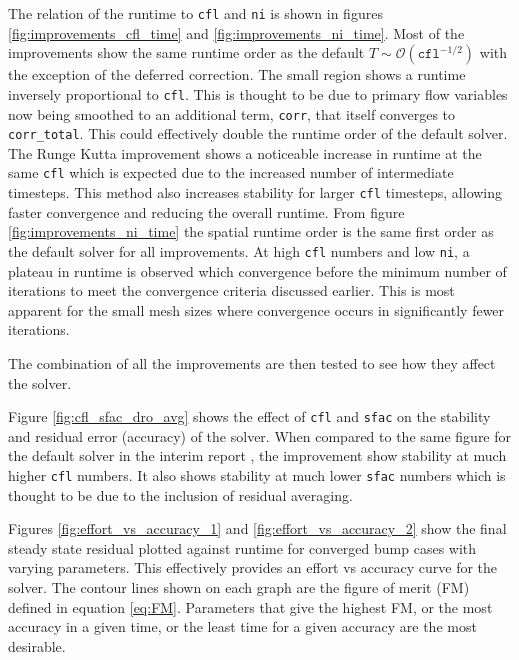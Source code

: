 \documentclass{article}
\begin{document}
The relation of the runtime to \texttt{cfl} and \texttt{ni} is shown in figures \ref{fig:improvements_cfl_time} and \ref{fig:improvements_ni_time}.
Most of the improvements show the same runtime order as the default $T\sim\mathcal{O}(\texttt{cfl}^{-1/2})$ with the exception of the deferred correction.
The small region shows a runtime inversely proportional to \texttt{cfl}.
This is thought to be due to primary flow variables now being smoothed to an additional term, \texttt{corr}, that itself converges to \texttt{corr\_total}.
This could effectively double the runtime order of the default solver.
The Runge Kutta improvement shows a noticeable increase in runtime at the same \texttt{cfl} which is expected due to the increased number of intermediate timesteps.
This method also increases stability for larger \texttt{cfl} timesteps, allowing faster convergence and reducing the overall runtime.
From figure \ref{fig:improvements_ni_time} the spatial runtime order is the same first order as the default solver for all improvements.
At high \texttt{cfl} numbers and low \texttt{ni}, a plateau in runtime is observed which convergence before the minimum number of iterations to meet the convergence criteria discussed earlier.
This is most apparent for the small mesh sizes where convergence occurs in significantly fewer iterations.


The combination of all the improvements are then tested to see how they affect the solver.

Figure \ref{fig:cfl_sfac_dro_avg} shows the effect of \texttt{cfl} and \texttt{sfac} on the stability and residual error (accuracy) of the solver.
When compared to the same figure for the default solver in the interim report \cite{interim}, the improvement show stability at much higher \texttt{cfl} numbers.
It also shows stability at much lower \texttt{sfac} numbers which is thought to be due to the inclusion of residual averaging.

Figures \ref{fig:effort_vs_accuracy_1} and \ref{fig:effort_vs_accuracy_2} show the final steady state residual plotted against runtime for converged bump cases with varying parameters.
This effectively provides an effort vs accuracy curve for the solver.
The contour lines shown on each graph are the figure of merit (FM) defined in equation \ref{eq:FM}.
Parameters that give the highest FM, or the most accuracy in a given time, or the least time for a given accuracy are the most desirable.
\end{document}
